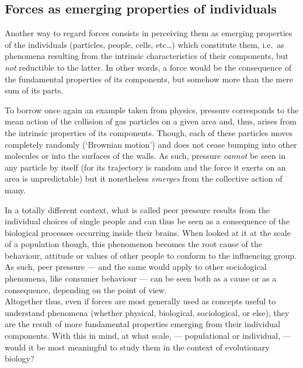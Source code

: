 \subsection{Forces as emerging properties of individuals}

Another way to regard forces consists in perceiving them as emerging properties of the individuals (particles, people, cells, etc…) which constitute them, i.e.\ as phenomena resulting from the intrinsic characteristics of their components, but \textit{not} reductible to the latter. 
In other words, a force would be the consequence of the fundamental properties of its components, but somehow more than the mere sum of its parts.

To borrow once again an example taken from physics, pressure corresponds to the mean action of the collision of gas particles on a given area and, thus, arises from the intrinsic properties of its components.
Though, each of these particles moves completely randomly (‘Brownian motion’) and does not cease bumping into other molecules or into the surfaces of the walls. 
As such, pressure \textit{cannot} be seen in any particle by itself (for its trajectory is random and the force it exerts on an area is unpredictable) but it nonetheless \textit{emerges} from the collective action of many.

In a totally different context, what is called peer pressure results from the individual choices of single people and can thus be seen as a consequence of the biological processes occurring inside their brains.
When looked at it at the scale of a population though, this phenomenon becomes the root cause of the behaviour, attitude or values of other people to conform to the influencing group.
As such, peer pressure — and the same would apply to other sociological phenomena, like consumer behaviour — can be seen both as a cause or as a consequence, depending on the point of view.\\

Altogether thus, even if forces are most generally used as concepts useful to understand phenomena (whether physical, biological, sociological, or else), they are the result of more fundamental properties emerging from their individual components.
With this in mind, at what scale, — populational or individual, — would it be most meaningful to study them in the context of evolutionary biology?



